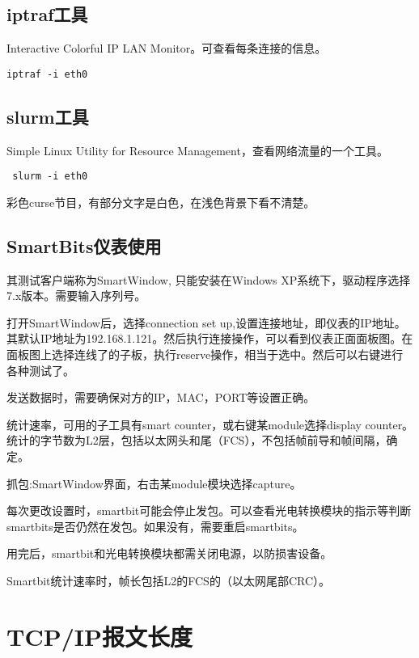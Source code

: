 \subsection{iptraf工具}
Interactive Colorful IP LAN Monitor。可查看每条连接的信息。
\begin{verbatim}
iptraf -i eth0
\end{verbatim}


\subsection{slurm工具}
 Simple Linux Utility for Resource Management，查看网络流量的一个工具。
 \begin{verbatim}
 slurm -i eth0
 \end{verbatim}

彩色curse节目，有部分文字是白色，在浅色背景下看不清楚。




\subsection{SmartBits仪表使用}
其测试客户端称为SmartWindow, 只能安装在Windows XP系统下，驱动程序选择7.x版本。需要输入序列号。

打开SmartWindow后，选择connection set up,设置连接地址，即仪表的IP地址。其默认IP地址为192.168.1.121。然后执行连接操作，可以看到仪表正面面板图。在面板图上选择连线了的子板，执行reserve操作，相当于选中。然后可以右键进行各种测试了。

发送数据时，需要确保对方的IP，MAC，PORT等设置正确。

统计速率，可用的子工具有smart counter，或右键某module选择display counter。统计的字节数为L2层，包括以太网头和尾（FCS），不包括帧前导和帧间隔，确定。

抓包:SmartWindow界面，右击某module模块选择capture。

每次更改设置时，smartbit可能会停止发包。可以查看光电转换模块的指示等判断smartbits是否仍然在发包。如果没有，需要重启smartbits。

用完后，smartbit和光电转换模块都需关闭电源，以防损害设备。

Smartbit统计速率时，帧长包括L2的FCS的（以太网尾部CRC）。














\section{TCP/IP报文长度}


